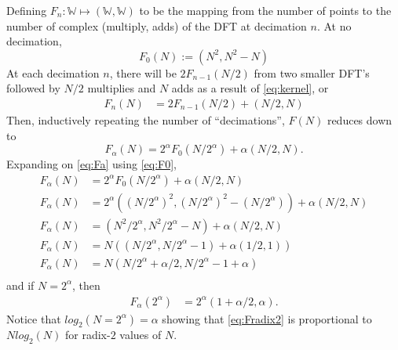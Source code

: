 \documentclass{article}
\begin{document}
Defining $F_n : \mathbb{W} \mapsto (\mathbb{W}, \mathbb{W})$ to be the mapping from the number of points to the number of complex (multiply, adds) of the DFT at decimation $n$. At no decimation,
%
\begin {equation} \label {eq:F0}
F_0 (N) := (N^2, N^2 - N)
\end {equation}
%
At each decimation $n$, there will be $2 F_{n-1}(N/2)$ from two smaller DFT's followed by $N/2$ multiplies and $N$ adds as a result of \eqref {eq:kernel}, or
%
\begin {equation} \label {eq:Fn}
\begin {aligned}
F_n (N) &= 2 F_{n - 1} (N/2) + (N/2, N)
\end {aligned}
\end {equation}
%
Then, inductively repeating the number of ``decimations'', $F(N)$ reduces down to
%
\begin {equation} \label {eq:Fa}
F_\alpha (N) = 2^\alpha F_0 (N/2^\alpha) + \alpha (N/2, N).
\end {equation}
%
Expanding on \eqref{eq:Fa} using \eqref{eq:F0},
%
\begin {equation}
\begin {aligned}
F_\alpha (N) &= 2^\alpha F_0 (N/2^\alpha) + \alpha (N/2, N) \\
F_\alpha (N) &= 2^\alpha ((N/2^\alpha)^2, (N/2^\alpha)^2 - (N/2^\alpha)) + \alpha (N/2, N) \\
F_\alpha (N) &= (N^2/2^\alpha, N^2/2^\alpha - N) + \alpha (N/2, N) \\
F_\alpha (N) &= N \left((N/2^\alpha, N/2^\alpha - 1) + \alpha (1/2, 1)\right) \\
F_\alpha (N) &= N (N/2^\alpha + \alpha/2, N/2^\alpha - 1 + \alpha) \\
\end {aligned}
\end {equation}
%
and if $N = 2^\alpha$, then
%
\begin {equation} \label {eq:Fradix2}
\begin {aligned}
F_\alpha (2^\alpha) &= 2^{\alpha} (1 + \alpha/2, \alpha).
\end {aligned}
\end {equation}
%
Notice that $log_2 (N = 2^\alpha) = \alpha$ showing that \eqref{eq:Fradix2} is proportional to $N log_2 (N)$ for radix-$2$ values of $N$.
%
\end{document}
